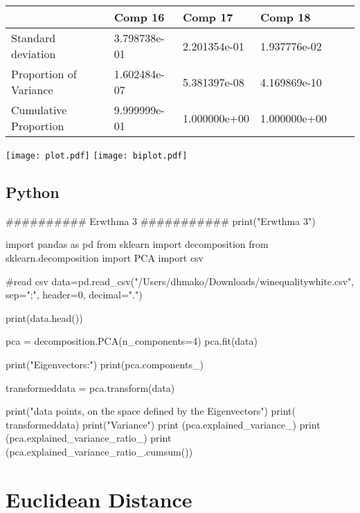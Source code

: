 \documentclass[10pt,towside,a4paper]{article}
\begin{document}
\begin{table}[h]
\begin{center}
\begin{tabular}{llllll}
	& Comp 16      & Comp 17      & Comp 18      &              &              \\ \hline
	Standard deviation     & 3.798738e-01 & 2.201354e-01 & 1.937776e-02 &              &              \\ \hline
	Proportion of Variance & 1.602484e-07 & 5.381397e-08 & 4.169869e-10 &              &              \\ \hline
	Cumulative Proportion  & 9.999999e-01 & 1.000000e+00 & 1.000000e+00 &              &              \\ \hline
\end{tabular}
\end{center}
\end{table}
\texttt{[image: plot.pdf]}
\texttt{[image: biplot.pdf]}
\newpage
	\subsection{Python}
\begin{python}
	##########  Erwthma 3 ###########
	print("Erwthma 3")
	
	import pandas as pd
	from sklearn import decomposition
	from sklearn.decomposition import PCA
	import csv
	
	#read csv
	data=pd.read_csv("/Users/dhmako/Downloads/winequalitywhite.csv", sep=";", header=0, decimal=".")
	
	
	print(data.head())
	
	pca = decomposition.PCA(n_components=4)
	pca.fit(data)
	
	print("Eigenvectors:")
	print(pca.components_)
	
	transformeddata = pca.transform(data)
	
	print("\nNew data points, on the space defined by the Eigenvectors")
	print( transformeddata)
	print("\n Variance")
	print (pca.explained_variance_)
	print (pca.explained_variance_ratio_)
	print (pca.explained_variance_ratio_.cumsum())
\end{python}

\section{Euclidean Distance}
\end{document}
